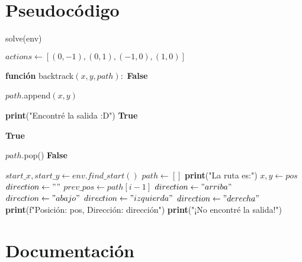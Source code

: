 \documentclass[a4paper,12pt]{article}
\begin{document}
\section{Pseudocódigo}
\begin{algorithm}
\caption{solve(env)}
\begin{algorithmic}
\STATE $actions \gets [(0, -1), (0, 1), (-1, 0), (1, 0)]$  

\STATE \textbf{función} backtrack$(x, y, path):$
\RETURN \textbf{False}
\ENDIF

\STATE $path$.append$(x, y)$

\STATE \textbf{print}("Encontré la salida :D")
\RETURN \textbf{True}
\ENDIF

\RETURN \textbf{True}
\ENDIF
\ENDFOR

\STATE $path$.pop()
\RETURN \textbf{False}
\ENDSTATE

\STATE $start\_x, start\_y \gets env.find\_start()$
\STATE $path \gets []$
\STATE \textbf{print}("La ruta es:")
\STATE $x, y \gets pos$
\STATE $direction \gets ""$
\STATE {}
\STATE $prev\_pos \gets path[i - 1]$
\STATE $direction \gets "arriba"$
\STATE $direction \gets "abajo"$
\STATE $direction \gets "izquierda"$
\STATE $direction \gets "derecha"$
\ENDIF
\ENDIF
\STATE \textbf{print}(f"Posición: {pos}, Dirección: {dirección}")
\ENDFOR
\ELSE   
\STATE \textbf{print}("¡No encontré la salida!")
\ENDIF
\end{algorithmic}
\end{algorithm}


\section{Documentación}





\newpage %
\thispagestyle{fancyref}
\printbibliography %
\end{document}
